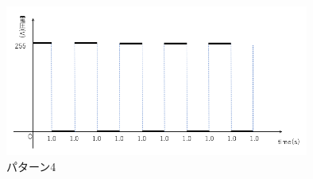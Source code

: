 \begin{figure}[h]
\centering
\includegraphics[clip,width=10cm]{./fig/patarn4.png}
\caption{パターン4}\label{patarn4}
\end{figure}


